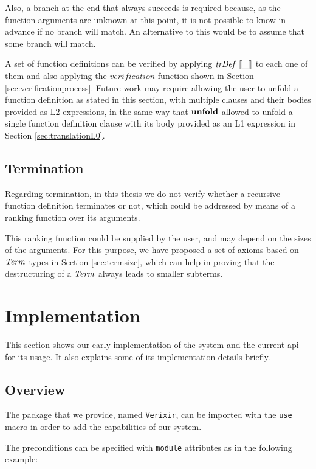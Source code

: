 Also, a branch at the end that always succeeds is required because, as the 
function arguments are unknown at this point, it is not possible to know in 
advance if no branch will match. An alternative to this would be to assume that
some branch will match.

A set of function definitions can be verified by applying $\mathit{trDef}~\llbracket\_\rrbracket$ to each
one of them and also applying the $\mathit{verification}$ function shown in
Section \ref{sec:verificationprocess}. Future work may require allowing the user
to unfold a function definition as stated in this section, with multiple clauses
and their bodies provided as L2 expressions, in the same way that $\textbf{unfold}$
allowed to unfold a single function definition clause with its body provided as
an L1 expression in Section \ref{sec:translationL0}.

\subsection{Termination}

Regarding termination, in this thesis we do not verify whether a recursive
function definition terminates or not, which could be addressed by means of a
ranking function over its arguments. 

This ranking function could be supplied by the user, and may depend on the sizes
of the arguments. For this purpose, we have proposed a set of axioms based on
$\mathit{Term}$ types in Section \ref{sec:termsize}, which can help in proving that the
destructuring of a $\mathit{Term}$ always leads to smaller subterms.

\section{Implementation}

This section shows our early implementation of the system and the current
\gls{api} for its usage. It also explains some of its implementation details 
briefly.

\subsection{Overview}

The package that we provide, named \verb|Verixir|, can be imported 
with the \verb|use| macro in order to add the capabilities of our system.

The preconditions can be specified with \verb|module| attributes as in the 
following example:

